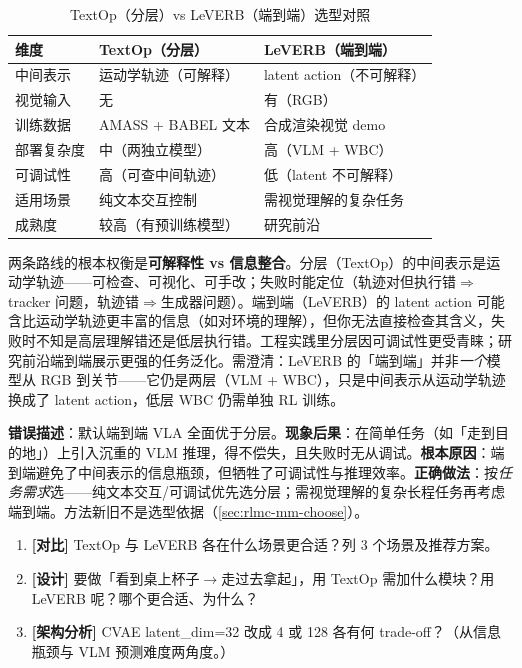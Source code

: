 \begin{table}[ht]
\centering
\small
\caption{TextOp（分层）vs LeVERB（端到端）选型对照}
\label{tab:rlmc-mm-leverb-compare}
\begin{tabular}{@{}lll@{}}
\toprule
维度 & TextOp（分层） & LeVERB（端到端） \\
\midrule
中间表示 & 运动学轨迹（可解释） & latent action（不可解释） \\
视觉输入 & 无 & 有（RGB） \\
训练数据 & AMASS + BABEL 文本 & 合成渲染视觉 demo \\
部署复杂度 & 中（两独立模型） & 高（VLM + WBC） \\
可调试性 & 高（可查中间轨迹） & 低（latent 不可解释） \\
适用场景 & 纯文本交互控制 & 需视觉理解的复杂任务 \\
成熟度 & 较高（有预训练模型） & 研究前沿 \\
\bottomrule
\end{tabular}
\end{table}

\begin{insight}[分层 vs 端到端 = 可解释性 vs 信息整合]\label{ins:rlmc-mm-hier-vs-e2e}
两条路线的根本权衡是\textbf{可解释性 vs 信息整合}。分层（TextOp）的中间表示是运动学轨迹——可检查、可视化、可手改；失败时能定位（轨迹对但执行错$\Rightarrow$tracker 问题，轨迹错$\Rightarrow$生成器问题）。端到端（LeVERB）的 latent action 可能含比运动学轨迹更丰富的信息（如对环境的理解），但你无法直接检查其含义，失败时不知是高层理解错还是低层执行错。工程实践里分层因可调试性更受青睐；研究前沿端到端展示更强的任务泛化。需澄清：LeVERB 的「端到端」并非\emph{一个}模型从 RGB 到关节——它仍是两层（VLM + WBC），只是中间表示从运动学轨迹换成了 latent action，低层 WBC 仍需单独 RL 训练。
\end{insight}

\begin{pitfall}[以为「端到端一定比分层好」]
\textbf{错误描述}：默认端到端 VLA 全面优于分层。\textbf{现象后果}：在简单任务（如「走到目的地」）上引入沉重的 VLM 推理，得不偿失，且失败时无从调试。\textbf{根本原因}：端到端避免了中间表示的信息瓶颈，但牺牲了可调试性与推理效率。\textbf{正确做法}：按\emph{任务需求}选——纯文本交互/可调试优先选分层；需视觉理解的复杂长程任务再考虑端到端。方法新旧不是选型依据（\cref{sec:rlmc-mm-choose}）。
\end{pitfall}

\begin{practice}[练习·LeVERB]
\begin{enumerate}
  \item \textbf{[对比]} TextOp 与 LeVERB 各在什么场景更合适？列 3 个场景及推荐方案。
  \item \textbf{[设计]} 要做「看到桌上杯子$\to$走过去拿起」，用 TextOp 需加什么模块？用 LeVERB 呢？哪个更合适、为什么？
  \item \textbf{[架构分析]} CVAE latent\_dim=32 改成 4 或 128 各有何 trade-off？（从信息瓶颈与 VLM 预测难度两角度。）
\end{enumerate}
\end{practice}

